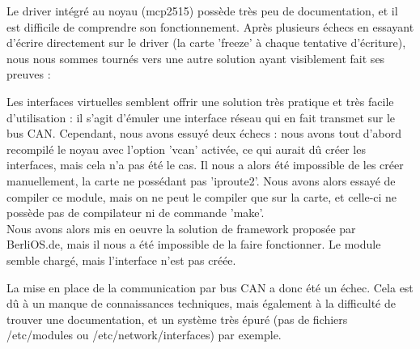\documentclass[a4,french,12pt]{article}
\begin{document}
Le driver intégré au noyau (mcp2515) possède très peu de documentation, et il est difficile de comprendre son fonctionnement. Après plusieurs échecs en essayant d'écrire directement sur le driver (la carte 'freeze' à chaque tentative d'écriture), nous nous sommes tournés vers une autre solution ayant visiblement fait ses preuves :

Les interfaces virtuelles semblent offrir une solution très pratique et très facile d'utilisation : il s'agit d'émuler une interface réseau qui en fait transmet sur le bus CAN. Cependant, nous avons essuyé deux échecs : nous avons tout d'abord recompilé le noyau avec l'option 'vcan' activée, ce qui aurait dû créer les interfaces, mais cela n'a pas été le cas. Il nous a alors été impossible de les créer manuellement, la carte ne possédant pas 'iproute2'. Nous avons alors essayé de compiler ce module, mais on ne peut le compiler que sur la carte, et celle-ci ne possède pas de compilateur ni de commande 'make'. \\
Nous avons alors mis en oeuvre la solution de framework proposée par BerliOS.de, mais il nous a été impossible de la faire fonctionner. Le module semble chargé, mais l'interface n'est pas créée.

La mise en place de la communication par bus CAN a donc été un échec. Cela est dû à un manque de connaissances techniques, mais également à la difficulté de trouver une documentation, et un système très épuré (pas de fichiers /etc/modules ou /etc/network/interfaces) par exemple.
\end{document}
